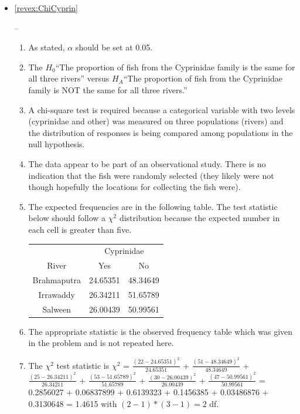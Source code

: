 \documentclass[10pt,openany]{book}\usepackage[]{graphicx}\usepackage[]{color}
\newenvironment{knitrout}{}{} %
\begin{document}
\begin{itemize}
\begin{knitrout}
{}



\end{knitrout}
  \item \hypertarget{ans:ChiCyprin}{\ref{revex:ChiCyprin}} --
    \begin{enumerate}
      \item As stated, $\alpha$ should be set at 0.05.
      \item The $H_{0}$``The proportion of fish from the Cyprinidae family is the same for all three rivers'' versus $H_{A}$``The proportion of fish from the Cyprinidae family is NOT the same for all three rivers.''
      \item A chi-square test is required because a categorical variable with two levels (cyprinidae and other) was measured on three populations (rivers) and the distribution of responses is being compared among populations in the null hypothesis.
      \item The data appear to be part of an observational study.  There is no indication that the fish were randomly selected (they likely were not though hopefully the locations for collecting the fish were).
      \item The expected frequencies are in the following table.  The test statistic below should follow a $\chi^{2}$ distribution because the expected number in each cell is greater than five.
        \begin{center}
          \begin{tabular}{|c|c|c|}
            \multicolumn{1}{c}{} & \multicolumn{2}{c}{Cyprinidae} \\
            \cline{2-3}
            \multicolumn{1}{c|}{River} & Yes & No \\
            \hline
            Brahmaputra & 24.65351 & 48.34649 \\
            \hline
            Irrawaddy & 26.34211 & 51.65789 \\
            \hline
            Salween & 26.00439 & 50.99561 \\
            \hline
          \end{tabular}
        \end{center}
      \item The appropriate statistic is the observed frequency table which was given in the problem and is not repeated here.
      \item The $\chi^{2}$ test statistic is $\chi^{2}$ = $\frac{(22-24.65351)^{2}}{24.65351}$ + $\frac{(51-48.34649)^{2}}{48.34649}$ + $\frac{(25-26.34211)^{2}}{26.34211}$ + $\frac{(53-51.65789)^{2}}{51.65789}$ + $\frac{(30-26.00439)^{2}}{26.00439}$ + $\frac{(47-50.99561)^{2}}{50.99561}$ = 0.2856027 + 0.06837899 + 0.6139323 + 0.1456385 + 0.03486876 + 0.3130648 = 1.4615 with $(2-1)*(3-1)=2$ df.

\end{enumerate}
\end{itemize}
\end{document}
